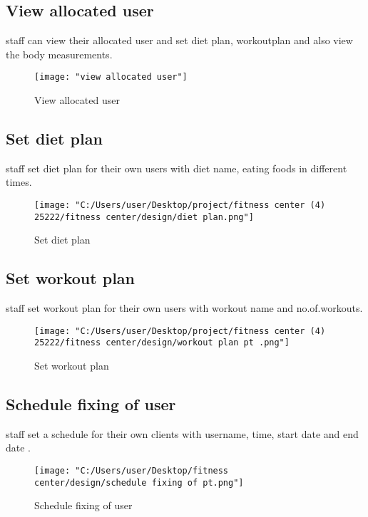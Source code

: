\documentclass[a4paper,12pt,toc=flat]{report}
\begin{document}
{{	\subsection{View allocated user}
	 \hspace*{12pt} staff can view their allocated user and set diet plan, workoutplan and also view the body measurements.
	\begin{figure}[bph]
		\begin{center}
			\texttt{[image: "view allocated user"]}
		\end{center}
		\caption{View allocated user}
	\end{figure}
	
	\pagebreak
	\subsection{Set diet plan}
 \hspace*{12pt} staff set diet plan for their own users with diet name, eating foods in different times.
	\begin{figure}[bph]
		\begin{center}
			\texttt{[image: "C:/Users/user/Desktop/project/fitness center (4) 25222/fitness center/design/diet plan.png"]}
		\end{center}
		\caption{Set diet plan}
	\end{figure}
	
	\subsection{Set workout plan}
 \hspace*{12pt} staff set workout plan for their own users with workout name and no.of.workouts.
	\begin{figure}[bph]
		\begin{center}
			\texttt{[image: "C:/Users/user/Desktop/project/fitness center (4) 25222/fitness center/design/workout plan pt .png"]}
		\end{center}
		\caption{Set workout plan}
	\end{figure}		
	\pagebreak	
	\subsection{Schedule fixing of user}
	 \hspace*{12pt} staff set a schedule for their own clients with username, time, start date and end date .
	\begin{figure}[bph]
		\begin{center}
			\texttt{[image: "C:/Users/user/Desktop/fitness center/design/schedule fixing of pt.png"]}
		\end{center}
		\caption{Schedule fixing of user}
	\end{figure}
}}
\end{document}
